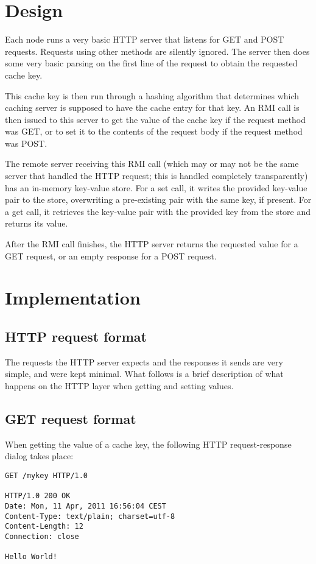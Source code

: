 \documentclass[11pt]{article}
\begin{document}
\section*{Design}
Each node runs a very basic HTTP server that listens for GET and POST requests. Requests using
other methods are silently ignored. The server then does some very basic parsing on the first line
of the request to obtain the requested cache key.

This cache key is then run through a hashing algorithm that determines which caching server is
supposed to have the cache entry for that key. An RMI call is then issued to this server to
get the value of the cache key if the request method was GET, or to set it to the contents
of the request body if the request method was POST.

The remote server receiving this RMI call (which may or may not be the same server that
handled the HTTP request; this is handled completely transparently) has an in-memory
key-value store. For a set call, it writes the provided key-value pair to the store,
overwriting a pre-existing pair with the same key, if present. For a get call, it
retrieves the key-value pair with the provided key from the store and returns its
value.

After the RMI call finishes, the HTTP server returns the requested value for a GET
request, or an empty response for a POST request.

\section*{Implementation}
\subsection*{HTTP request format}
The requests the HTTP server expects and the responses it sends are very simple,
and were kept minimal. What follows is a brief description of what happens on the
HTTP layer when getting and setting values.

\subsection*{GET request format}
When getting the value of a cache key, the following HTTP request-response
dialog takes place:

\begin{lstlisting}
GET /mykey HTTP/1.0

HTTP/1.0 200 OK
Date: Mon, 11 Apr, 2011 16:56:04 CEST
Content-Type: text/plain; charset=utf-8
Content-Length: 12
Connection: close

Hello World!
\end{lstlisting}
\end{document}
